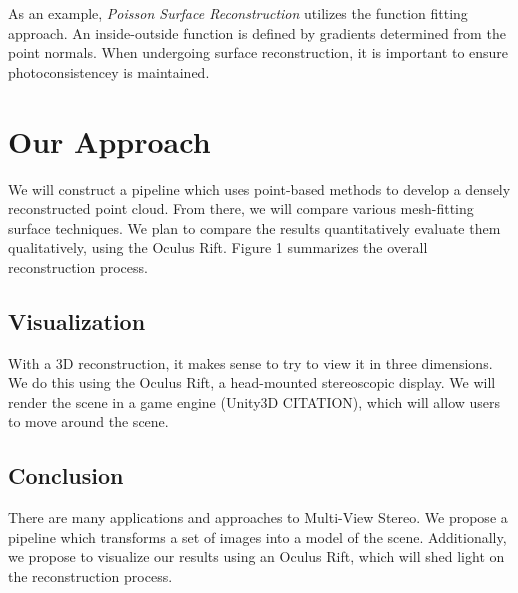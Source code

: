 \documentclass[10pt,twocolumn,letterpaper]{article}
\begin{document}
As an example, \textit{Poisson Surface Reconstruction} utilizes the function fitting approach.  An inside-outside function is defined by gradients determined from the point normals.\cite{poisson}  When undergoing surface reconstruction, it is important to ensure photoconsistencey is maintained. 


\section{Our Approach}

We will construct a pipeline which uses point-based methods to develop a densely reconstructed point cloud. From there, we will compare various mesh-fitting surface techniques.  We plan to compare the results quantitatively evaluate them qualitatively, using the Oculus Rift.  Figure 1 summarizes the overall reconstruction process.

\subsection{Visualization}
With a 3D reconstruction, it makes sense to try to view it in three dimensions. We do this using the Oculus Rift, a head-mounted stereoscopic display. We will render the scene in a game engine (Unity3D CITATION), which will allow users to move around the scene.

\subsection{Conclusion}
There are many applications and approaches to Multi-View Stereo. We propose a pipeline which transforms a set of images into a model of the scene.  Additionally, we propose to visualize our results using an Oculus Rift, which will shed light on the reconstruction process.



{\small
  
  
}
\end{document}
